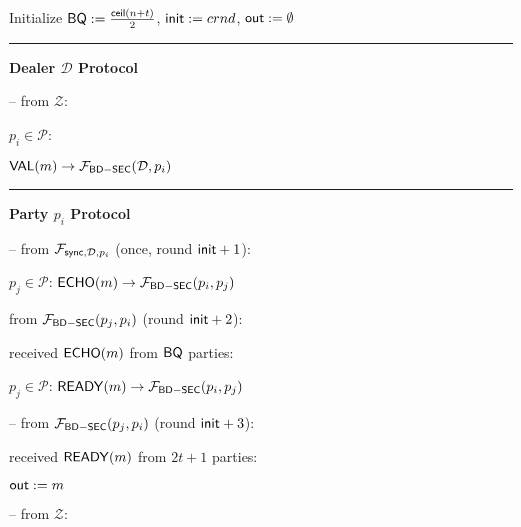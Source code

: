\begin{bbox}[title={$\Pi_{\msf{Bracha}} (\mathcal{D}, \mathcal{P} = p_1,...,p_n)$ in $\F_{\msf{BD-SEC}}$-hybrid}]

Initialize ${\mathsf {BQ}} := \frac{{\mathsf {ceil}}(n+t)}{2}$, ${\mathsf {init}} := crnd$, ${\mathsf {out}} := \emptyset$

\vspace{2mm} \hrule \vspace{2mm}

{\bf Dealer $\mathcal{D}$ Protocol}

-- \OnInput {} from $\mathcal{Z}$:

	\dquad \For $p_i \in \mathcal{P}$:

		\dquad \quad \Send ${\mathsf {VAL}}(m) \rightarrow \mathcal{F}_{{\mathsf {BD-SEC}}}(\mathcal{D},p_i)$

\vspace{2mm} \hrule \vspace{2mm}

{\bf Party $p_i$ Protocol}

-- \OnInput {} from $\mathcal{F}_{{\mathsf {sync}},\mathcal{D},p_i}$ (once, round ${\mathsf {init}}+1$):

	\dquad \For $p_j \in \mathcal{P}$: \Send ${\mathsf {ECHO}}(m) \rightarrow \mathcal{F}_{{\mathsf {BD-SEC}}}(p_i,p_j)$

 \OnInput {} from $\mathcal{F}_{{\mathsf {BD-SEC}}}(p_j,p_i)$ (round ${\mathsf {init}}+2$):

	\dquad \If received ${\mathsf {ECHO}}(m)$ from ${\mathsf {BQ}}$ parties:

		\dquad \quad \For $p_j \in \mathcal{P}$: \Send ${\mathsf {READY}}(m) \rightarrow \mathcal{F}_{{\mathsf {BD-SEC}}}(p_i,p_j)$ 

-- \OnInput {} from $\mathcal{F}_{{\mathsf {BD-SEC}}}(p_j,p_i)$ (round ${\mathsf {init}}+3$):

	\dquad \If received ${\mathsf {READY}}(m)$ from $2t+1$ parties:

		\dquad \quad ${\mathsf {out}} := m$




-- \OnInput {} from $\mathcal{Z}$:


\end{bbox}
